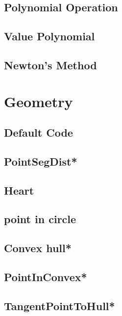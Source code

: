 \subsection{Polynomial Operation}

\subsection{Value Polynomial}

\subsection{Newton's Method}


\section{Geometry}
\subsection{Default Code}

\subsection{PointSegDist*} %

\subsection{Heart}

\subsection{point in circle}

\subsection{Convex hull*} %

\subsection{PointInConvex*} %

\subsection{TangentPointToHull*} %

